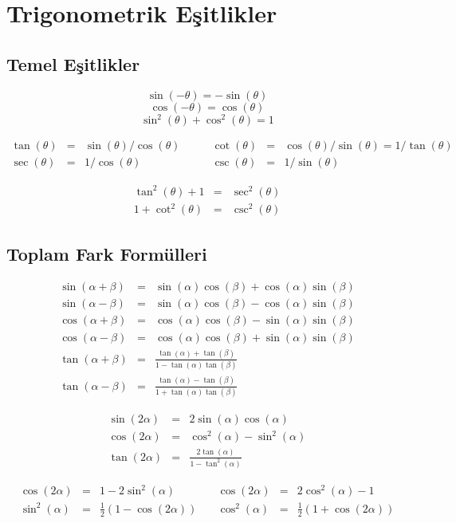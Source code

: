 \section{Trigonometrik Eşitlikler}

\subsection*{Temel Eşitlikler}
\[ \sin(-\theta) = -\sin(\theta) \]
\[ \cos(-\theta) = \cos(\theta) \]
\[ \sin^2(\theta) + \cos^2(\theta) = 1 \]

\[
\begin{array}{rclrcl}
\tan(\theta) &=& \sin(\theta)/\cos(\theta)\quad & \quad
\cot(\theta) &=& \cos(\theta)/\sin(\theta) = 1/\tan(\theta)\\
\sec(\theta) &=& 1/\cos(\theta)\quad & \quad
\csc(\theta) &=& 1/\sin(\theta)
\end{array}
\]

\begin{eqnarray*}
\tan^2(\theta) + 1 &=& \sec^2(\theta)\\
1 + \cot^2(\theta) &=& \csc^2(\theta)
\end{eqnarray*}

\subsection*{Toplam Fark Formülleri}

\begin{eqnarray*}
\sin(\alpha+\beta) &=& \sin(\alpha)\cos(\beta) + \cos(\alpha)\sin(\beta) \\
\sin(\alpha-\beta) &=& \sin(\alpha)\cos(\beta) - \cos(\alpha)\sin(\beta) \\
\cos(\alpha+\beta) &=& \cos(\alpha)\cos(\beta) - \sin(\alpha)\sin(\beta) \\
\cos(\alpha-\beta) &=& \cos(\alpha)\cos(\beta) + \sin(\alpha)\sin(\beta) \\
\tan(\alpha+\beta) &=& \frac{\tan(\alpha) + \tan(\beta)}{1 - \tan(\alpha)\tan(\beta)} \\
\tan(\alpha-\beta) &=& \frac{\tan(\alpha) - \tan(\beta)}{1 + \tan(\alpha)\tan(\beta)}
\end{eqnarray*}

\begin{eqnarray*}
\sin(2\alpha) &=&  2\sin(\alpha)\cos(\alpha) \\
\cos(2\alpha) &=& \cos^2(\alpha) - \sin^2(\alpha) \\
\tan(2\alpha) &=& \frac{2\tan(\alpha)}{1-\tan^2(\alpha)}
\end{eqnarray*}

\[
\begin{array}{rclrcl}
\cos(2\alpha) &=& 1 - 2\sin^2(\alpha) & \quad
\cos(2\alpha) &=& 2\cos^2(\alpha) - 1 \\

\sin^2(\alpha) &=& \frac{1}{2}(1 - \cos(2\alpha)) & \quad
\cos^2(\alpha) &=& \frac{1}{2}(1 + \cos(2\alpha)) \\
\end{array}
\]
